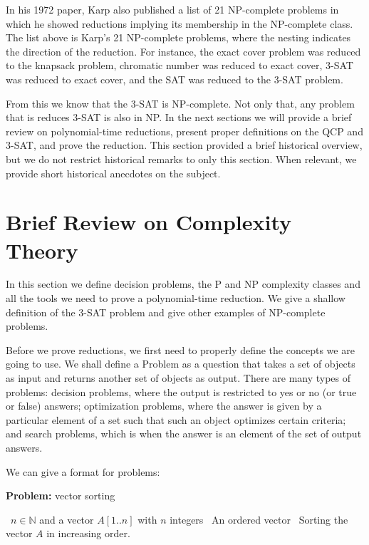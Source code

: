 \documentclass{amsart}
\theoremstyle{plain}
\numberwithin{equation}{section}
\begin{document}
In his 1972 paper, Karp also published a list of 21 NP-complete problems in which he showed
reductions implying its membership in the NP-complete class. The list above is Karp's 21
NP-complete problems, where the nesting indicates the direction of the reduction. For instance, the
exact cover problem was reduced to the knapsack problem, chromatic number was reduced to exact
cover, 3-SAT was reduced to exact cover, and the SAT was reduced to the 3-SAT problem.

From this we know that the 3-SAT is NP-complete. Not only that, any problem that is reduces
3-SAT is also in NP\@. In the next sections we will provide a brief review on polynomial-time
reductions, present proper definitions on the QCP and 3-SAT, and prove the reduction. This section
provided a brief historical overview, but we do not restrict historical remarks to only this
section. When relevant, we provide short historical anecdotes on the subject.

\section{Brief Review on Complexity Theory}

In this section we define decision problems, the P and NP complexity classes and all the tools we
need to prove a polynomial-time reduction. We give a shallow definition of the 3-SAT problem and
give other examples of NP-complete problems.

Before we prove reductions, we first need to properly define the concepts we are going to use. We
shall define a Problem as a question that takes a set of objects as input and returns another set
of objects as output. There are many types of problems: decision problems, where the output is
restricted to yes or no (or true or false) answers; optimization problems, where the answer is
given by a particular element of a set such that such an object optimizes certain criteria; and
search problems, which is when the answer is an element of the set of output answers.

We can give a format for problems:

\begin{algorithm}[h]
  \caption*{\textbf{Problem:} vector sorting}
  \begin{algorithmic}[1]
    \Require\, $n\in\mathbb{N}$ and a vector $A[1..n]$ with $n$ integers
    \Ensure\, An ordered vector
    \Statex\, Sorting the vector $A$ in increasing order.
  \end{algorithmic}
\end{algorithm}
\end{document}
